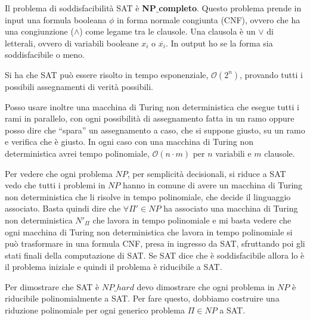 \begin{teorema}
    Il problema di soddisfacibilità SAT è \textbf{NP}$\_$\textbf{completo}.
    Questo problema prende in input una formula booleana $\phi$ in forma normale
    congiunta (CNF), ovvero che ha una congiunzione ($\land$) come legame tra le
    clausole. Una clausola è un $\lor$ di letterali, ovvero di variabili booleane
    $x_i$ o $\overline{x_i}$. In output ho se la forma sia soddisfacibile o meno.
\end{teorema}
\begin{dimostrazione}
    Si ha che SAT può essere risolto in tempo esponenziale, $\mathcal{O}(2^n)$, 
    provando tutti i possibili assegnamenti di verità possibili.
    
    Posso usare inoltre una macchina di Turing non deterministica che esegue 
    tutti i rami in parallelo, con ogni possibilità di assegnamento fatta in un 
    ramo oppure posso dire che “spara” un assegnamento a caso, che si suppone 
    giusto, su un ramo e verifica che è giusto. In ogni caso con una macchina di 
    Turing non deterministica avrei tempo polinomiale, $\mathcal{O}(n \cdot m)$ 
    per $n$ variabili e $m$ clausole.

    Per vedere che ogni problema $NP$, per semplicità decisionali, si riduce a SAT 
    vedo che tutti i problemi in $NP$ hanno in comune di avere un macchina di 
    Turing non deterministica che li risolve in tempo polinomiale, che decide il 
    linguaggio associato. Basta quindi dire che $\forall \Pi ' \in  NP$ ha 
    associato una macchina di Turing non deterministica $N'_{\Pi}$ che lavora in 
    tempo polinomiale e mi basta vedere che ogni macchina di Turing non 
    deterministica che lavora in tempo polinomiale si può trasformare in una 
    formula CNF, presa in ingresso da SAT, sfruttando poi gli stati finali della 
    computazione di SAT. Se SAT dice che è soddisfacibile allora lo è il problema 
    iniziale e quindi il problema è riducibile a SAT.
\end{dimostrazione}

\begin{dimostrazione}
    Per dimostrare che SAT è $NP\_hard$ devo dimostrare che ogni problema in $NP$
    è riducibile polinomialmente a SAT. Per fare questo, dobbiamo costruire una 
    riduzione polinomiale per ogni generico problema $\Pi \in NP$ a SAT.
\end{dimostrazione}